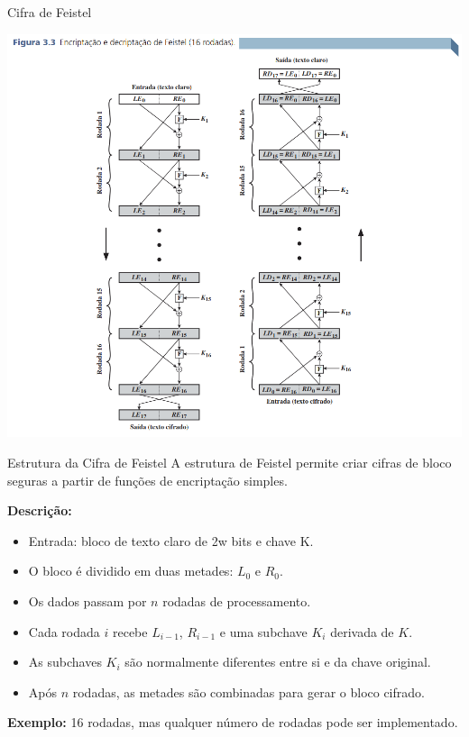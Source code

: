 \begin{frame}{Cifra de Feistel}

\centering
\includegraphics[width=0.6\linewidth]{Figuras/cifra-de-feistel.png}


\end{frame}

\begin{frame}{Estrutura da Cifra de Feistel}
A estrutura de Feistel permite criar cifras de bloco seguras a partir de funções de encriptação simples.

\medskip
\textbf{Descrição:}
\begin{itemize}
    \item Entrada: bloco de texto claro de 2w bits e chave K.
    \item O bloco é dividido em duas metades: $L_0$ e $R_0$.
    \item Os dados passam por $n$ rodadas de processamento.
    \item Cada rodada $i$ recebe $L_{i-1}$, $R_{i-1}$ e uma subchave $K_i$ derivada de $K$.
    \item As subchaves $K_i$ são normalmente diferentes entre si e da chave original.
    \item Após $n$ rodadas, as metades são combinadas para gerar o bloco cifrado.
\end{itemize}

\medskip
\textbf{Exemplo:} 16 rodadas, mas qualquer número de rodadas pode ser implementado.
\end{frame}

